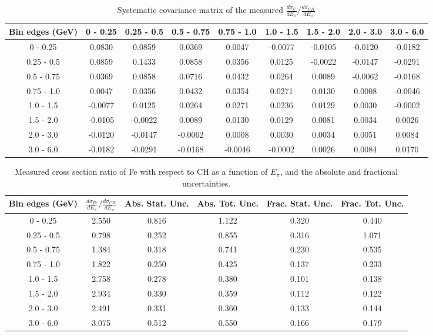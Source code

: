 \documentclass[aps,prl,twocolumn,superscriptaddress,nofootinbib]{revtex4-1}
\begin{document}
\begin{table}[h!]
  \centering
  \caption{Systematic covariance matrix of the measured $\frac{d\sigma_{C}}{dE_{\pi}}/\frac{d\sigma_{CH}}{dE_{\pi}}$}
    \begin{tabular}{c||cccccccc}
      Bin edges (GeV) & 0 - 0.25 & 0.25 - 0.5 & 0.5 - 0.75 & 0.75 - 1.0 & 1.0 - 1.5 & 1.5 - 2.0 & 2.0 - 3.0 & 3.0 - 6.0 \\
\hline \hline
        0 - 0.25 &  0.0830 &  0.0859 &  0.0369 &  0.0047 & -0.0077 & -0.0105 & -0.0120 & -0.0182 \\
      0.25 - 0.5 &  0.0859 &  0.1433 &  0.0858 &  0.0356 &  0.0125 & -0.0022 & -0.0147 & -0.0291 \\
      0.5 - 0.75 &  0.0369 &  0.0858 &  0.0716 &  0.0432 &  0.0264 &  0.0089 & -0.0062 & -0.0168 \\
      0.75 - 1.0 &  0.0047 &  0.0356 &  0.0432 &  0.0354 &  0.0271 &  0.0130 &  0.0008 & -0.0046 \\
       1.0 - 1.5 & -0.0077 &  0.0125 &  0.0264 &  0.0271 &  0.0236 &  0.0129 &  0.0030 & -0.0002 \\
       1.5 - 2.0 & -0.0105 & -0.0022 &  0.0089 &  0.0130 &  0.0129 &  0.0081 &  0.0034 &  0.0026 \\
       2.0 - 3.0 & -0.0120 & -0.0147 & -0.0062 &  0.0008 &  0.0030 &  0.0034 &  0.0051 &  0.0084 \\
       3.0 - 6.0 & -0.0182 & -0.0291 & -0.0168 & -0.0046 & -0.0002 &  0.0026 &  0.0084 &  0.0170 \\
    \end{tabular}
  \label{tablecov:C_Systematic_Epi}
\end{table}

\begin{table}[h!]
  \centering
  \caption{Measured cross section ratio of Fe with respect to CH as a function
  of $E_{\pi}$,  and the absolute and fractional uncertainties.}
    \begin{tabular}{c||c||c|c||c|c}
      Bin edges (GeV) & $\frac{d\sigma_{Fe}}{dE_{\pi}}/\frac{d\sigma_{CH}}{dE_{\pi}}$ & Abs. Stat. Unc. & Abs. Tot. Unc. & Frac. Stat. Unc. & Frac. Tot. Unc. \\
      \hline\hline
        0 - 0.25 & 2.550 & 0.816 & 1.122 & 0.320 & 0.440 \\
      0.25 - 0.5 & 0.798 & 0.252 & 0.855 & 0.316 & 1.071 \\
      0.5 - 0.75 & 1.384 & 0.318 & 0.741 & 0.230 & 0.535 \\
      0.75 - 1.0 & 1.822 & 0.250 & 0.425 & 0.137 & 0.233 \\
       1.0 - 1.5 & 2.758 & 0.278 & 0.380 & 0.101 & 0.138 \\
       1.5 - 2.0 & 2.934 & 0.330 & 0.359 & 0.112 & 0.122 \\
       2.0 - 3.0 & 2.491 & 0.331 & 0.360 & 0.133 & 0.144 \\
       3.0 - 6.0 & 3.075 & 0.512 & 0.550 & 0.166 & 0.179 \\
    \end{tabular}
  \label{table:EpiXSecRatio_Fe}
\end{table}
\end{document}
